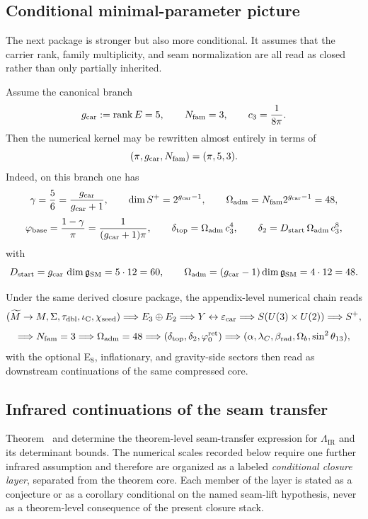 \subsection{Conditional minimal-parameter picture}

The next package is stronger but also more conditional. It assumes that the carrier rank, family multiplicity, and seam normalization are all read as closed rather than only partially inherited.

\begin{principle}
Assume the canonical branch
\[
g_{\mathrm{car}}:=\operatorname{rank} E=5,
\qquad
N_{\mathrm{fam}}=3,
\qquad
c_3=\frac{1}{8\pi}.
\]
Then the numerical kernel may be rewritten almost entirely in terms of
\[
(\pi,g_{\mathrm{car}},N_{\mathrm{fam}})=(\pi,5,3).
\]
Indeed, on this branch one has
\[
\gamma=\frac56=\frac{g_{\mathrm{car}}}{g_{\mathrm{car}}+1},
\qquad
\dim S^+=2^{g_{\mathrm{car}}-1},
\qquad
\Omega_{\mathrm{adm}}=N_{\mathrm{fam}}2^{g_{\mathrm{car}}-1}=48,
\]
\[
\varphi_{\mathrm{base}}=\frac{1-\gamma}{\pi}=\frac{1}{(g_{\mathrm{car}}+1)\pi},
\qquad
\delta_{\mathrm{top}}=\Omega_{\mathrm{adm}}\,c_3^4,
\qquad
\delta_2=D_{\mathrm{start}}\,\Omega_{\mathrm{adm}}\,c_3^8,
\]
with
\[
D_{\mathrm{start}}=g_{\mathrm{car}}\,\dim\mathfrak g_{\mathrm{SM}}=5\cdot 12=60,
\qquad
\Omega_{\mathrm{adm}}=(g_{\mathrm{car}}-1)\dim\mathfrak g_{\mathrm{SM}}=4\cdot 12=48.
\]
\end{principle}

\begin{remark}
Under the same derived closure package, the appendix-level numerical chain reads
\[
(\widetilde M\to M,\Sigma,\tau_{\mathrm{dbl}},\iota_{\mathrm C},\chi_{\mathrm{seed}})
\Longrightarrow
E_3\oplus E_2
\Longrightarrow
Y \leftrightarrow \varepsilon_{\mathrm{car}}
\Longrightarrow
S(U(3)\times U(2))
\Longrightarrow
S^+,
\]
\[
\Longrightarrow
N_{\mathrm{fam}}=3
\Longrightarrow
\Omega_{\mathrm{adm}}=48
\Longrightarrow
(\delta_{\mathrm{top}},\delta_2,\varphi_0^{\mathrm{ret}})
\Longrightarrow
(\alpha,\lambda_C,\beta_{\mathrm{rad}},\Omega_b,\sin^2\theta_{13}),
\]
with the optional E$_8$, inflationary, and gravity-side sectors then read as downstream continuations of the same compressed core.
\end{remark}

\subsection{Infrared continuations of the seam transfer}
\label{app:ir-seam-continuations}

Theorem~ and  determine the
theorem-level seam-transfer expression for $\Lambda_{\mathrm{IR}}$ and its determinant bounds.
The numerical scales recorded below require one further infrared assumption and therefore are
organized as a labeled \emph{conditional closure layer}, separated from the theorem core. Each
member of the layer is stated as a conjecture or as a corollary conditional on the named seam-lift
hypothesis, never as a theorem-level consequence of the present closure stack.

